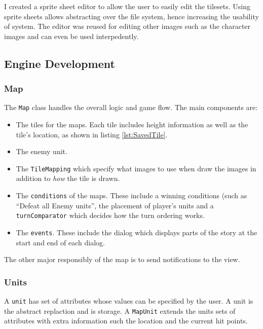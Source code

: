 I created a sprite sheet editor to allow the user to easily edit the tilesets. Using sprite sheets allows abstracting over the file system, hence increasing the usability of system. The editor was reused for editing other images such as the character images and can even be used interpedently.

\clearpage
\subsection{Engine Development}
\label{sub:engine_development_and_testing}
\subsubsection{Map}
\label{ssub:maps}


The \texttt{Map} class handles the overall logic and game flow.   The main components are:
\begin{itemize}
\item The tiles for the maps. Each tile includes height information as well as the tile's location, as shown in listing \ref{lst:SavedTile}.

\item The enemy unit.     

\item The \texttt{TileMapping} which specify what images to use when draw the images in addition to \emph{how} the tile is drawn. 

\item  The \texttt{conditions} of the maps. These include a winning conditions (such as ``Defeat all Enemy units'',  the placement of player's units and a \texttt{turnComparator} which decides how the turn ordering works.  

\item  The \texttt{events}. These include the dialog which displays parts of the story at the start and end of each dialog. 
\end{itemize}

The other major responsibly of the map is to send notifications to the view.  


\subsubsection{Units}
\label{ssub:units}
A \texttt{unit} has set of attributes whose values can be specified by the user. A unit is the abstract replaction and is storage.  A \texttt{MapUnit} extends the units sets of attributes with extra information such the location and the current hit points.


